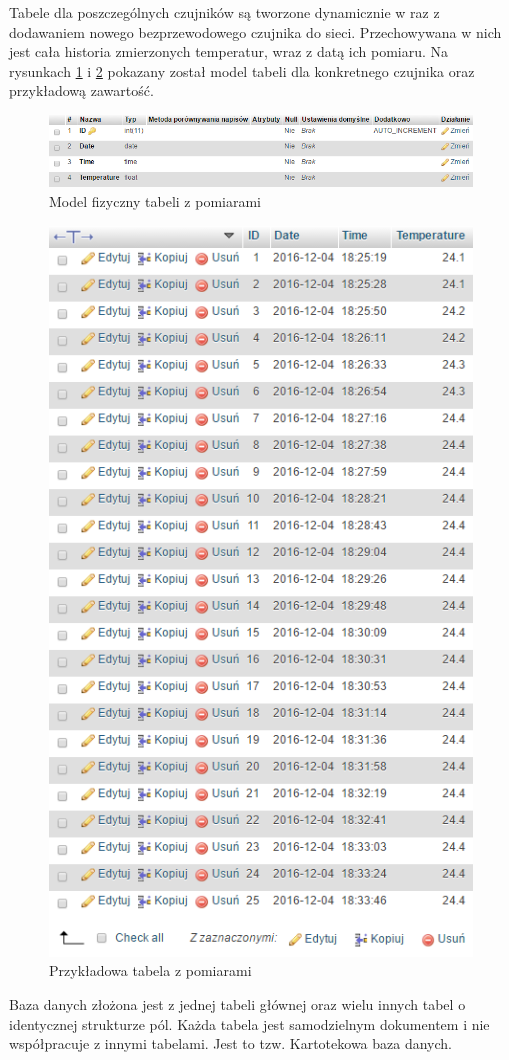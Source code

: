\documentclass[eng,printmode,openright]{mgr} %
\begin{document}
\begin{enumerate}
\begin{itemize}
		Tabele dla poszczególnych czujników są tworzone dynamicznie w raz z dodawaniem nowego bezprzewodowego czujnika do sieci. Przechowywana w nich jest cała historia zmierzonych temperatur, wraz z datą ich pomiaru. Na rysunkach \ref{model_fizyczny_sensor} i \ref{sensor_table} pokazany został model tabeli dla konkretnego czujnika oraz przykładową zawartość.
		\begin{figure}[H]
			\centering
			\includegraphics[width=1\linewidth]{BazaDanych4.png}
			\caption{Model fizyczny tabeli z pomiarami}
			\label{model_fizyczny_sensor}
		\end{figure}
		\begin{figure}[H]
			\centering
			\includegraphics[width=0.6\linewidth]{BazaDanych3.png}
			\caption{Przykładowa tabela z pomiarami}
			\label{sensor_table}
		\end{figure}


		Baza danych złożona jest z jednej tabeli głównej oraz wielu innych tabel o identycznej strukturze pól. Każda tabela jest samodzielnym dokumentem i nie współpracuje z innymi tabelami. Jest to tzw. Kartotekowa baza danych.
		

\end{itemize}
\end{enumerate}
\end{document}
